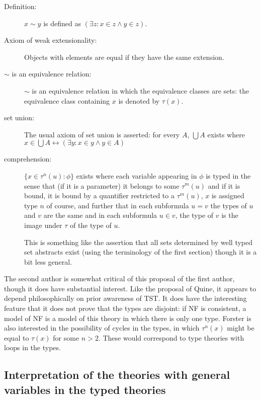 \documentclass[12pt]{article}
\begin{document}
\begin{description}

\item[Definition:]  $x \sim y$ is defined as $(\exists z:x \in z \wedge y \in z)$.

\item[Axiom of weak extensionality:]  Objects with elements are equal if they have the same extension.

\item[$\sim$ is an equivalence relation:]  $\sim$ is an equivalence relation in which the equivalence classes are sets:  the equivalence class containing $x$ is denoted by $\tau(x)$.

\item[set union:]  The usual axiom of set union is asserted:  for every $A$, $\bigcup A$ exists where $x \in \bigcup A \leftrightarrow (\exists y:x \in y \wedge y \in A)$

\item[comprehension:]  $\{x \in \tau^n(u):\phi\}$ exists
where each variable appearing in $\phi$ is typed in the sense that
(if it is a parameter) it belongs to some $\tau^m(u)$ and if it is bound, it is bound by a quantifier restricted to a $\tau^m(u)$, $x$ is assigned type $n$ of course, and further that in each subformula $u=v$ the types of $u$ and $v$ are the same and in each subformula $u \in v$, the type of $v$ is the image under $\tau$ of the type of $u$.

This is something like the assertion that all sets determined by well typed set abstracts exist (using the terminology of the first section) though it is a bit less general.


\end{description}

The second author is somewhat critical of this proposal of the first author, though it does have substantial interest.  Like the proposal of Quine, it appears to depend philosophically on prior awareness of TST.  It does have the interesting feature that it does not prove that the types are disjoint:  if NF is consistent, a model of NF is a model of this theory in which there is only one type.  Forster is also interested in the possibility of cycles in the types, in which $\tau^n(x)$ might be equal to $\tau(x)$ for some $n>2$.  These would correspond to type theories with loops in the types.

\subsection{Interpretation of the theories with general variables in the typed theories}
\end{document}
